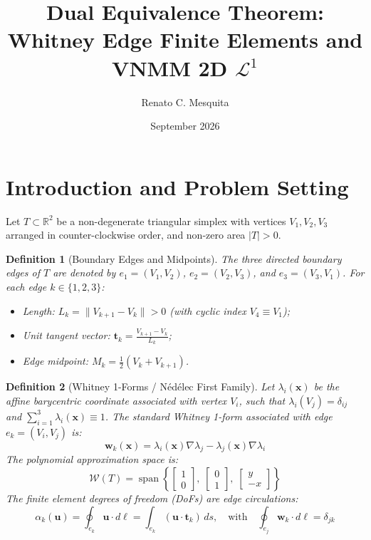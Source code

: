 \documentclass[11pt,a4paper]{article}
\title{\textbf{Dual Equivalence Theorem: Whitney Edge Finite Elements and VNMM 2D $\mathcal{L}^1$}}
\author{Renato C. Mesquita}
\date{September 2026}
\newtheorem{definition}{Definition}
\begin{document}
\maketitle

\section{Introduction and Problem Setting}

Let $T \subset \mathbb{R}^2$ be a non-degenerate triangular simplex with vertices $V_1, V_2, V_3$ arranged in counter-clockwise order, and non-zero area $|T| > 0$.

\begin{definition}[Boundary Edges and Midpoints]
The three directed boundary edges of $T$ are denoted by $e_1 = (V_1, V_2)$, $e_2 = (V_2, V_3)$, and $e_3 = (V_3, V_1)$. For each edge $k \in \{1, 2, 3\}$:
\begin{itemize}
    \item Length: $L_k = \|V_{k+1} - V_k\| > 0$ (with cyclic index $V_4 \equiv V_1$);
    \item Unit tangent vector: $\mathbf{t}_k = \frac{V_{k+1} - V_k}{L_k}$;
    \item Edge midpoint: $M_k = \frac{1}{2}(V_k + V_{k+1})$.
\end{itemize}
\end{definition}

\begin{definition}[Whitney 1-Forms / N\'ed\'elec First Family]
Let $\lambda_i(\mathbf{x})$ be the affine barycentric coordinate associated with vertex $V_i$, such that $\lambda_i(V_j) = \delta_{ij}$ and $\sum_{i=1}^3 \lambda_i(\mathbf{x}) \equiv 1$. The standard Whitney 1-form associated with edge $e_k = (V_i, V_j)$ is:
\begin{equation}
    \mathbf{w}_k(\mathbf{x}) = \lambda_i(\mathbf{x}) \nabla \lambda_j - \lambda_j(\mathbf{x}) \nabla \lambda_i
\end{equation}
The polynomial approximation space is:
\begin{equation}
    \mathcal{W}(T) = \operatorname{span}\left\{ \begin{bmatrix} 1 \\ 0 \end{bmatrix}, \; \begin{bmatrix} 0 \\ 1 \end{bmatrix}, \; \begin{bmatrix} y \\ -x \end{bmatrix} \right\}
\end{equation}
The finite element degrees of freedom (DoFs) are edge circulations:
\begin{equation}
    \alpha_k(\mathbf{u}) = \oint_{e_k} \mathbf{u} \cdot d\boldsymbol{\ell} = \int_{e_k} (\mathbf{u} \cdot \mathbf{t}_k) \, ds, \quad \text{with} \quad \oint_{e_j} \mathbf{w}_k \cdot d\boldsymbol{\ell} = \delta_{jk}
\end{equation}
\end{definition}
\end{document}
